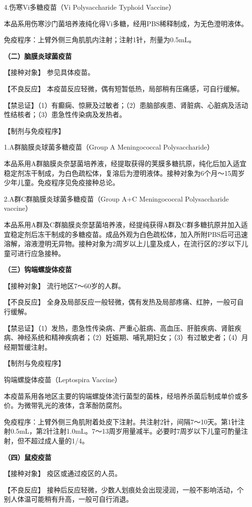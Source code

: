 4.伤寒Vi多糖疫苗（Vi Polysaccharide Typhoid Vaccine）

本品系用伤寒沙门菌培养液纯化得Vi多糖，经用PBS稀释制成，为无色澄明液体。

免疫程序：上臂外侧三角肌肌内注射；注射1针，剂量为0.5mL。

\textbf{（二）脑膜炎球菌疫苗}

【接种对象】 参见具体疫苗。

【不良反应】 本疫苗反应轻微，偶有短暂低热，局部稍有压痛感，可自行缓解。

【禁忌证】（1）有癫痫、惊厥及过敏者；（2）患脑部疾患、肾脏病、心脏病及活动性结核者；（3）患急性传染病及发热者。

【制剂与免疫程序】

1.A群脑膜炎球菌多糖疫苗（Group A Meningococcal Polysaccharide）

本品系用A群脑膜炎奈瑟菌培养液，经提取获得的荚膜多糖抗原，纯化后加入适宜稳定剂冻干制成，为白色疏松体，复溶后为澄明液体。接种对象为6个月～15周岁少年儿童。免疫程序见免疫接种总论。

2.A群C群脑膜炎球菌多糖疫苗（Group A+C Meningococcal Polysaccharide
vaccine）

本品系用A群及C群脑膜炎奈瑟菌培养液，经提纯获得A群及C群多糖抗原并加入适宜稳定剂后冻干制成的多糖疫苗。成品外观为白色疏松体，加入所附PBS后可迅速溶解，溶液澄明无异物。接种对象为2周岁以上儿童及成人，在流行区的2岁以下儿童可进行应急接种。

\textbf{（三）钩端螺旋体疫苗}

【接种对象】 流行地区7～60岁的人群。

【不良反应】
全身及局部反应一般轻微，偶有发热及局部疼痛、红肿，一般可自行缓解。

【禁忌证】（1）发热，患急性传染病、严重心脏病、高血压、肝脏疾病、肾脏疾病、神经系统和精神疾病者；（2）妊娠期、哺乳期妇女；（3）有过敏史者；（4）月经期暂缓注射。

【制剂与免疫程序】

钩端螺旋体疫苗（Leptospira Vaccine）

本疫苗系用各地区主要的钩端螺旋体流行菌型的菌株，经培养杀菌后制成单价或多价。为微带乳光的液体，含苯酚防腐剂。

免疫程序：上臂外侧三角肌附着处皮下注射。共注射2针，间隔7～10天。第1针注射0.5mL，第2针注射1.0mL。7～13周岁用量减半。必要时7周岁以下儿童可酌量注射，但不超过成人量的1/4。

\textbf{（四）鼠疫疫苗}

【接种对象】 疫区或通过疫区的人员。

【不良反应】
接种后反应轻微，少数人划痕处会出现浸润，一般不影响活动，个别人体温可能稍有升高，一般可自行消退。

